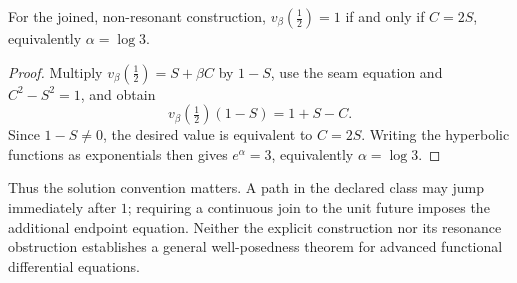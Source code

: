\begin{corollary}
For the joined, non-resonant construction, $v_\beta(\tfrac12)=1$
if and only if $C=2S$, equivalently $\alpha=\log3$.
\end{corollary}
\begin{proof}
Multiply $v_\beta(\tfrac12)=S+\beta C$ by $1-S$, use the seam
equation and $C^2-S^2=1$, and obtain
\[
 v_\beta(\tfrac12)(1-S)=1+S-C.
\]
Since $1-S\ne0$, the desired value is equivalent to $C=2S$.
Writing the hyperbolic functions as exponentials then gives
$e^\alpha=3$, equivalently $\alpha=\log3$.
\end{proof}

Thus the solution convention matters. A path in the declared class may
jump immediately after $1$; requiring a continuous join to the unit
future imposes the additional endpoint equation. Neither the explicit
construction nor its resonance obstruction establishes a general
well-posedness theorem for advanced functional differential equations.
